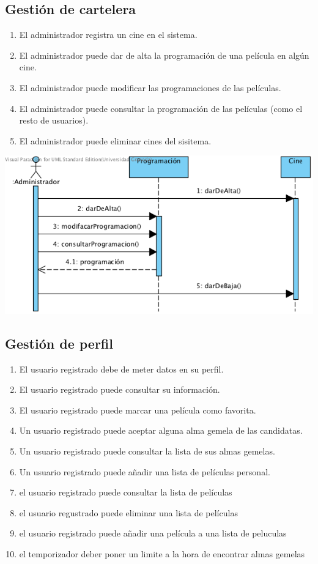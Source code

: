 \documentclass{article}
\begin{document}
	\subsection*{Gestión de cartelera}
	\begin{enumerate}
		\item El administrador registra un cine en el sistema.
		\item El administrador puede dar de alta la programación de una película en algún cine.
		\item El administrador puede modificar las programaciones de las películas.
		\item El administrador puede consultar la programación de las películas (como el resto de usuarios).
		\item El administrador puede eliminar cines del sisitema.
	\end{enumerate}
			\includegraphics[width=1\linewidth]{./Sec-Cartelera}

	\subsection*{Gestión de perfil}
	\begin{enumerate}
		\item El usuario registrado debe de meter datos en su perfil.
    		\item El usuario registrado puede consultar su información.
    		\item El usuario registrado puede marcar una película como favorita.
    		\item Un usuario registrado puede aceptar alguna alma gemela de las candidatas.
    		\item Un usuario registrado puede consultar la lista de sus almas gemelas.
    		\item Un usuario registrado puede añadir una lista de películas personal.
    		\item el usuario registrado puede consultar la lista de películas
    		\item el usuario regustrado puede eliminar una lista de películas
    		\item el usuario registrado puede añadir una película a una lista de peluculas
    		\item el temporizador deber poner un limite a la hora de encontrar almas gemelas
	\end{enumerate}
		
\end{document}
